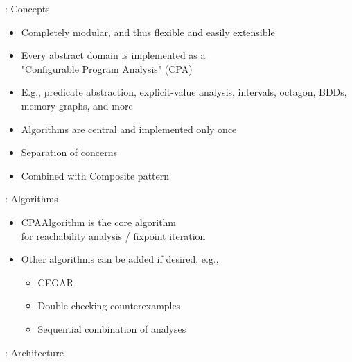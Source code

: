 
\begin{frame}{\cpacheckertitle: Concepts}
  \begin{itemize}
    \item Completely modular, and thus flexible and easily extensible
    \item Every abstract domain is implemented as a\\
    "Configurable Program Analysis" (CPA)
    \item E.g., predicate abstraction, explicit-value analysis, intervals, octagon, BDDs, memory graphs, and more
    \item Algorithms are central and implemented only once
    \item Separation of concerns
    \item Combined with Composite pattern
  \end{itemize}
\end{frame}


\begin{frame}{\cpacheckertitle: Algorithms}
  \begin{itemize}
    \item CPAAlgorithm is the core algorithm\\ for reachability analysis / fixpoint iteration
    \item Other algorithms can be added if desired, e.g.,
    \begin{itemize}
      \item CEGAR
      \item Double-checking counterexamples
      \item Sequential combination of analyses
    \end{itemize}
  \end{itemize}
\end{frame}


\begin{frame}[fragile]{\cpacheckertitle: Architecture}
  \resizebox{\textwidth}{!}{
    
  }
\end{frame}


